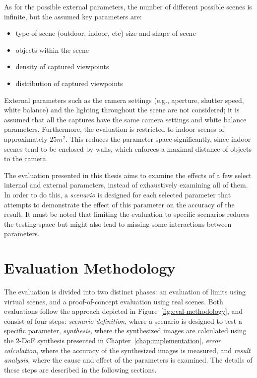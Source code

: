 As for the possible external parameters, the number of different possible scenes is infinite, but the assumed key parameters are:
\begin{itemize}
  \item type of scene (outdoor, indoor, etc) \ar size and shape of scene
  \item objects within the scene
  \item density of captured viewpoints
  \item distribution of captured viewpoints
\end{itemize}

External parameters such as the camera settings (e.g., aperture, shutter speed, white balance) and the lighting throughout the scene are not considered; it is assumed that all the captures have the same camera settings and white balance parameters. Furthermore, the evaluation is restricted to indoor scenes of approximately $25m^2$. This reduces the parameter space significantly, since indoor scenes tend to be enclosed by walls, which enforces a maximal distance of objects to the camera.

The evaluation presented in this thesis aims to examine the effects of a few select internal and external parameters, instead of exhaustively examining all of them. In order to do this, a \emph{scenario} is designed for each selected parameter that attempts to demonstrate the effect of this parameter on the accuracy of the result. It must be noted that limiting the evaluation to specific scenarios reduces the testing space but might also lead to missing some interactions between parameters.


\section{Evaluation Methodology} \label{sec:eval_methodology}
The evaluation is divided into two distinct phases: an evaluation of limits using virtual scenes, and a proof-of-concept evaluation using real scenes. Both evaluations follow the approach depicted in Figure~\ref{fig:eval-methodology}, and consist of four steps: \emph{scenario definition}, where a scenario is designed to test a specific parameter, \emph{synthesis}, where the synthesized images are calculated using the 2-DoF synthesis presented in Chapter~\ref{chap:implementation}, \emph{error calculation}, where the accuracy of the synthesized images is measured, and \emph{result analysis}, where the cause and effect of the parameters is examined. The details of these steps are described in the following sections.

